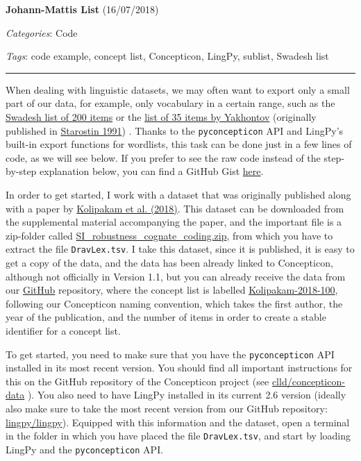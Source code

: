\documentclass[
  english,
  a4paper,
  oneside,tablecaptionabove
]{scrbook}
\newcommand{\passthrough}[1]{#1}
\begin{document}
\textbf{Johann-Mattis List} (16/07/2018)

\emph{Categories}: Code

\emph{Tags}: code example, concept list, Concepticon, LingPy, sublist,
Swadesh list

\begin{center}\rule{0.5\linewidth}{\linethickness}\end{center}

When dealing with linguistic datasets, we may often want to export only
a small part of our data, for example, only vocabulary in a certain
range, such as the
\href{http://concepticon.clld.org/contributions/Swadesh-1952-200}{Swadesh
list of 200 items} or the
\href{http://concepticon.clld.org/contributions/Yakhontov-1991-35}{list
of 35 items by Yakhontov} (originally published in
\href{http://bibliography.lingpy.org?key=Starostin1991}{Starostin 1991})
. Thanks to the \passthrough{\lstinline!pyconcepticon!} API and LingPy's
built-in export functions for wordlists, this task can be done just in a
few lines of code, as we will see below. If you prefer to see the raw
code instead of the step-by-step explanation below, you can find a
GitHub Gist
\href{https://gist.github.com/LinguList/7804cb127e74a9263b4eab9c5af4bc6f}{here}.

In order to get started, I work with a dataset that was originally
published along with a paper by
\href{http://bibliography.lingpy.org?key=Kolipakam2018}{Kolipakam et al.
(2018)}. This dataset can be downloaded from the supplemental material
accompanying the paper, and the important file is a zip-folder called
\href{http://rsos.royalsocietypublishing.org/highwire/filestream/18890/field_highwire_adjunct_files/3/rsos171504supp4.zip}{SI\_robustness\_cognate\_coding.zip},
from which you have to extract the file
\passthrough{\lstinline!DravLex.tsv!}. I take this dataset, since it is
published, it is easy to get a copy of the data, and the data has been
already linked to Concepticon, although not officially in Version 1.1,
but you can already receive the data from our
\href{https://github.com/clld/concepticon-data}{GitHub} repository,
where the concept list is labelled
\href{https://github.com/clld/concepticon-data/blob/master/concepticondata/conceptlists/Kolipakam-2018-100.tsv}{Kolipakam-2018-100},
following our Concepticon naming convention, which takes the first
author, the year of the publication, and the number of items in order to
create a stable identifier for a concept list.

To get started, you need to make sure that you have the
\passthrough{\lstinline!pyconcepticon!} API installed in its most recent
version. You should find all important instructions for this on the
GitHub repository of the Concepticon project (see
\href{https://github.com/clld/concepticon-data}{clld/concepticon-data}
). You also need to have LingPy installed in its current 2.6 version
(ideally also make sure to take the most recent version from our GitHub
repository: \href{https://github.com/lingpy/lingpy}{lingpy/lingpy}).
Equipped with this information and the dataset, open a terminal in the
folder in which you have placed the file
\passthrough{\lstinline!DravLex.tsv!}, and start by loading LingPy and
the \passthrough{\lstinline!pyconcepticon!} API.
\end{document}
